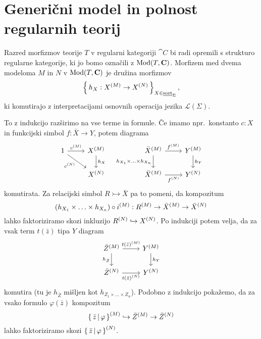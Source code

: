 \documentclass[../kategoricna_logika.tex]{subfiles}
\begin{document}
\section{Generični model in polnost regularnih teorij}
\begin{definicija}
Razred morfizmov teorije $T$ v regularni kategoriji $\cat{C}$ bi radi opremili s strukturo regularne kategorije,
ki jo bomo označili z $\Mod(T, \cat{C})$. Morfizem med dvema modeloma $M$ in $N$ v $\Mod(T, \cat{C})$ je družina morfizmov
$$\set{h_X : \interp{X} \to \interp[N]{X}}_{X \in \underline{\mathrm{sort}}_\Sigma},$$
ki komutirajo z interpretacijami osnovnih operacija jezika $\mathcal{L}(\Sigma)$.
\end{definicija}
To z indukcijo razširimo na vse terme in formule. Če imamo npr.\ konstanto $c:X$ in funkcijski simbol $f:\bar{X} \to Y$,
potem diagrama
\begin{equation*}
  \begin{tikzcd}
    1 \ar[dr, "c^{(N)}"'] \ar[r, "\interp{c}"] & \interp{X} \ar[d, "h_X"]  &&  \interp{\bar{X}} \ar[d, "h_{X_1} \times \ldots \times h_{X_n}"'] \ar[r, "\interp{f}"] & \interp{Y} \ar[d, "h_Y"]\\
    & \interp[N]{X} && \interp{\bar{X}} \ar[r, "{\interp[N]{f}}"'] & \interp[N]{Y}
  \end{tikzcd}
\end{equation*}
komutirata. Za relacijski simbol $R \rightarrowtail \bar{X}$ pa to pomeni, da kompozitum
$$(h_{X_1} \times \ldots \times h_{X_n}) \circ \interp{i} : \interp{R} \to \interp{\bar{X}} \to \interp[N]{\bar{X}}$$
lahko faktoriziramo skozi inkluzijo $\interp[N]{R} \hookrightarrow \interp[N]{X}$.
Po indukciji potem velja, da za vsak term $t(\bar{z})$ tipa $Y$ diagram
\begin{equation*}
  \begin{tikzcd}
    \interp{\bar{Z}} \ar[d, "h_{\bar{Z}}"'] \ar[r, "{t(\bar{z})^{(M)}}"] & \interp{Y} \ar[d, "h_Y"] \\
    \interp[N]{\bar{Z}} \ar[r, "{\interp[N]{t(\bar{z})}}"'] & \interp[N]{Y}
  \end{tikzcd}
\end{equation*}
komutira (tu je $h_{\bar{Z}}$ mišljen kot $h_{Z_1 \times \ldots \times Z_n}$).
Podobno z indukcijo pokažemo, da za vsako formulo $\varphi(\bar{z})$ kompozitum
$$\interp{\set{\bar{z} \,\middle|\, \varphi}} \hookrightarrow \interp{\bar{Z}} \to \interp[N]{\bar{Z}}$$
lahko faktoriziramo skozi $\interp[N]{\set{\bar{z} \,\middle|\, \varphi}}$.
\end{document}
